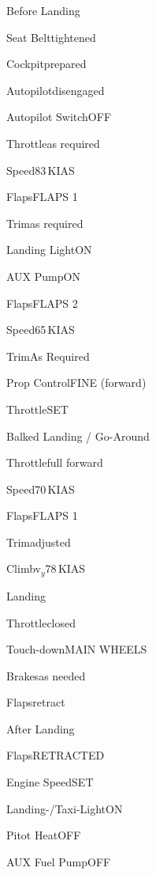 \begin{checklist}{Before Landing}
  \item{Seat Belt}{tightened}
  \item{Cockpit}{prepared}
  \item{Autopilot}{disengaged}
  \item{Autopilot Switch}{OFF}
  \item{Throttle}{as required}
  \item{Speed}{83\,KIAS}
  \item{Flaps}{FLAPS 1}
  \item{Trim}{as required}
  \item{Landing Light}{ON}
  \item{AUX Pump}{ON}
  \item{Flaps}{FLAPS 2}
  \item{Speed}{65\,KIAS}
  \item{Trim}{As Required}
  \item{Prop Control}{FINE (forward)}
  \item{Throttle}{SET}
\end{checklist}

\begin{checklist}{Balked Landing / Go-Around}
  \item{Throttle}{full forward}
  \item{Speed}{70\,KIAS}
  \item{Flaps}{FLAPS 1}
  \item{Trim}{adjusted}
  \item{Climb}{v$_{y}$78\,KIAS} 
\end{checklist}

\begin{checklist}{Landing}
  \item{Throttle}{closed}
  \item{Touch-down}{MAIN WHEELS}
  \item{Brakes}{as needed}
  \item{Flaps}{retract}
\end{checklist}

\begin{checklist}{After Landing}
  \item{Flaps}{RETRACTED}
  \item{Engine Speed}{SET}
  \item{Landing-/Taxi-Light}{ON}
  \item{Pitot Heat}{OFF}
  \item{AUX Fuel Pump}{OFF}
\end{checklist}


